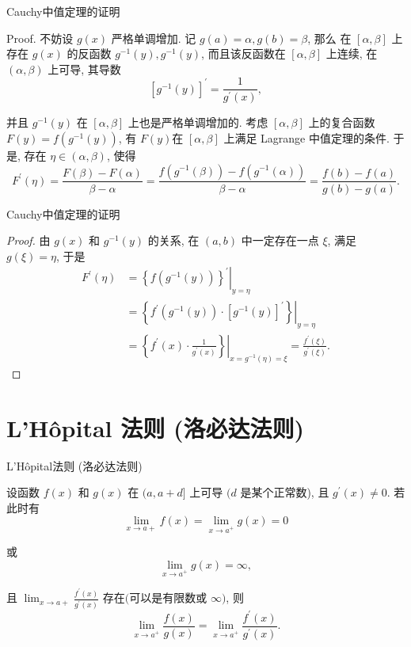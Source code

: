 \documentclass[
10pt,
aspectratio=43,
]{beamer}
\begin{document}
\begin{frame}{Cauchy中值定理的证明}
	\begin{block}{Proof.}
		不妨设 $g(x)$ 严格单调增加.	记 $g(a)=\alpha, g(b)=\beta$, 那么 在 $[\alpha, \beta]$ 上存在 $g(x)$ 的反函数 $g^{-1}(y), g^{-1}(y)$, 而且该反函数在 $[\alpha, \beta]$ 上连续, 在 $(\alpha, \beta)$ 上可导, 其导数
		$$
			\left[g^{-1}(y)\right]^{\prime}=\frac{1}{g^{\prime}(x)},
		$$

		并且 $g^{-1}(y)$ 在 $[\alpha, \beta]$ 上也是严格单调增加的. \pause
		考虑 $[\alpha, \beta]$ 上的复合函数 $F(y)=f\left(g^{-1}(y)\right)$, 有 $F(y)$在 $[\alpha, \beta]$ 上满足 Lagrange 中值定理的条件. \pause 于是, 存在 $\eta \in(\alpha, \beta)$, 使得
		$$
			F^{\prime}(\eta)=\frac{F(\beta)-F(\alpha)}{\beta-\alpha}=\frac{f\left(g^{-1}(\beta)\right)-f\left(g^{-1}(\alpha)\right)}{\beta-\alpha}=\frac{f(b)-f(a)}{g(b)-g(a)} .
		$$

	\end{block}
\end{frame}


\begin{frame}{Cauchy中值定理的证明}
	\begin{proof}
		由 $g(x)$ 和 $g^{-1}(y)$ 的关系, 在 $(a, b)$ 中一定存在一点 $\xi$, 满足 $g(\xi)=\eta$, 于是
		$$
			\begin{aligned}
				F^{\prime}(\eta) & =\left.\left\{f\left(g^{-1}(y)\right)\right\}^{\prime}\right|_{y=\eta}                                                                  \\
				                 & =\left.\left\{f^{\prime}\left(g^{-1}(y)\right) \cdot\left[g^{-1}(y)\right]^{\prime}\right\}\right|_{y=\eta}                             \\
				                 & =\left.\left\{f^{\prime}(x) \cdot \frac{1}{g^{\prime}(x)}\right\}\right|_{x=g^{-1}(\eta)=\xi}=\frac{f^{\prime}(\xi)}{g^{\prime}(\xi)} .
			\end{aligned}
		$$
	\end{proof}
\end{frame}

\section{L'Hôpital 法则 (洛必达法则)}
\begin{frame}{L'Hôpital法则 (洛必达法则)}
	\begin{theorem}[L'Hôpital法则]
		设函数 $f(x)$ 和 $g(x)$ 在 $(a, a+d]$ 上可导 $(d$ 是某个正常数), 且 $g^{\prime}(x) \neq 0$. 若此时有
		$$
			\lim _{x \rightarrow a+} f(x)=\lim _{x \rightarrow a^{+}} g(x)=0
		$$

		或
		$$
			\lim _{x \rightarrow a^{+}} g(x)=\infty,
		$$

		且 $\displaystyle\lim _{x \rightarrow a+} \frac{f^{\prime}(x)}{g^{\prime}(x)}$ 存在$($可以是有限数或 $\infty)$, 则
		$$
			\lim _{x \rightarrow a^{+}} \frac{f(x)}{g(x)}=\lim _{x \rightarrow a^{+}} \frac{f^{\prime}(x)}{g^{\prime}(x)} .
		$$
	\end{theorem}

\end{frame}
\end{document}

